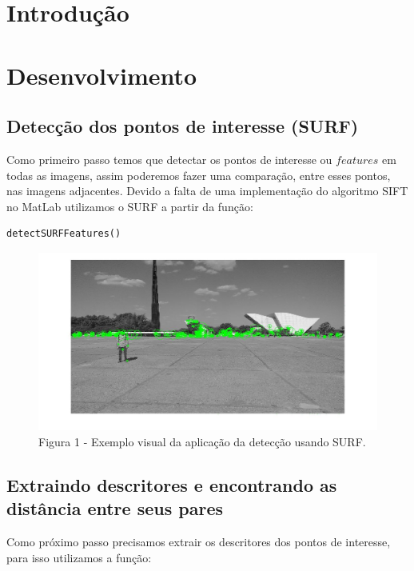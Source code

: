 \documentclass[a4paper, 12pt]{article}
\begin{document}
	\section*{Introdução}


    \section*{Desenvolvimento}
		\subsection*{Detecção dos pontos de interesse (SURF)}
        Como primeiro passo temos que detectar os pontos de interesse ou $features$ em
         todas as imagens, assim poderemos fazer uma comparação, entre esses pontos, nas imagens adjacentes.
        Devido a falta de uma implementação do algoritmo SIFT no MatLab utilizamos o SURF a partir da função:
        \\
        \begin{lstlisting}[frame=single]
detectSURFFeatures()
        \end{lstlisting}

        \begin{figure}[H]
            \centering
            \includegraphics[width=1\linewidth]{SURF.jpg}
            \caption{Figura 1 - Exemplo visual da aplicação da detecção usando SURF.}
        \end{figure}

		\subsection*{Extraindo descritores e encontrando as distância entre seus pares}
        Como próximo passo precisamos extrair os descritores dos pontos de interesse, para isso
        utilizamos a função:
\end{document}
